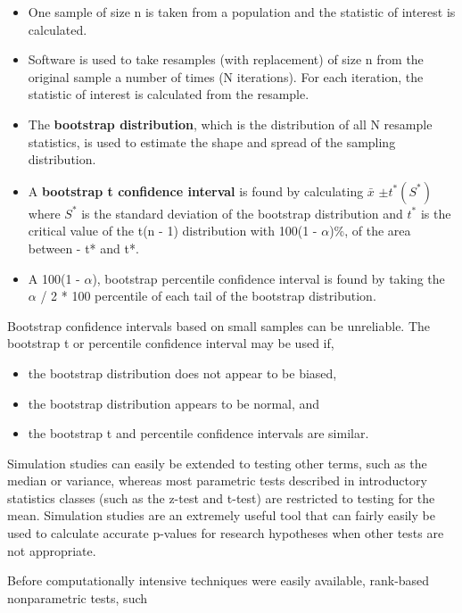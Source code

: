 \documentclass[
]{report}
\providecommand{\tightlist}{%
  \setlength{\itemsep}{0pt}\setlength{\parskip}{0pt}}
\theoremstyle{definition}
\theoremstyle{definition}
\theoremstyle{definition}
\theoremstyle{definition}
\theoremstyle{remark}
\begin{document}
\begin{itemize}
\tightlist
\item
  One sample of size n is taken from a population and the statistic of interest is calculated.
\item
  Software is used to take resamples (with replacement) of size n from the original sample a number of
  times (N iterations). For each iteration, the statistic of interest is calculated from the resample.
\item
  The \textbf{bootstrap distribution}, which is the distribution of all N resample statistics, is used to estimate
  the shape and spread of the sampling distribution.
\item
  A \textbf{bootstrap t confidence interval} is found by calculating \(\bar{x}\) \(\pm t^*(S^*)\) where \(S^*\) is the standard
  deviation of the bootstrap distribution and \(t^*\) is the critical value of the t(n - 1) distribution with
  100(1 - \(\alpha\))\%, of the area between - t* and t*.
\item
  A 100(1 - \(\alpha\)), bootstrap percentile confidence interval is found by taking the \(\alpha\) / 2 * 100
  percentile of each tail of the bootstrap distribution.
\end{itemize}

Bootstrap confidence intervals based on small samples can be unreliable. The bootstrap t or percentile confidence interval may be used if,

\begin{itemize}
\tightlist
\item
  the bootstrap distribution does not appear to be biased,
\item
  the bootstrap distribution appears to be normal, and
\item
  the bootstrap t and percentile confidence intervals are similar.
\end{itemize}

Simulation studies can easily be extended to testing other terms, such as the median or variance, whereas most parametric tests described in introductory statistics classes (such as the z-test and t-test) are restricted to testing for the mean. Simulation studies are an extremely useful tool that can fairly easily be used to calculate accurate p-values for research hypotheses when other tests are not appropriate.

Before computationally intensive techniques were easily available, rank-based nonparametric tests, such
\end{document}
